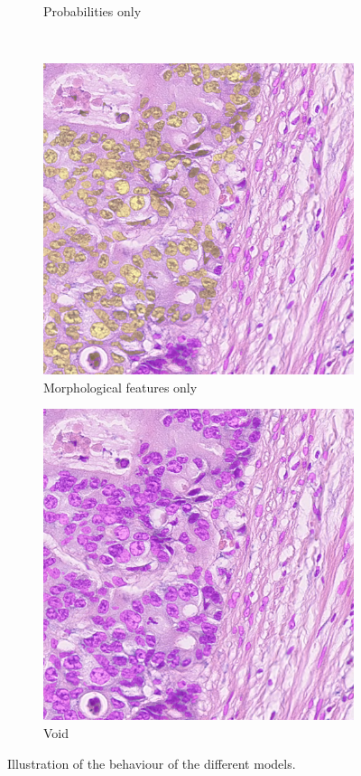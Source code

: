 \begin{figure}[H]
\begin{subfigure}[b]{0.45\textwidth}
    \caption{Probabilities only}
    \label{fig:consep-no-morph2}
  \end{subfigure}
  \\
  \begin{subfigure}[b]{0.45\textwidth}
    \includegraphics[width=\textwidth]{imgs/qual/consep/no-prior2.png}
    \caption{Morphological features only}
    \label{fig:consep-no-prior2}
  \end{subfigure}
  \hfill
  \begin{subfigure}[b]{0.45\textwidth}
    \includegraphics[width=\textwidth]{imgs/qual/consep/void2.png}
    \caption{Void}
    \label{fig:consep-void2}
  \end{subfigure}
  \caption{Illustration of the behaviour of the different models.}
  \label{fig:consep-qual2}
\end{figure}


